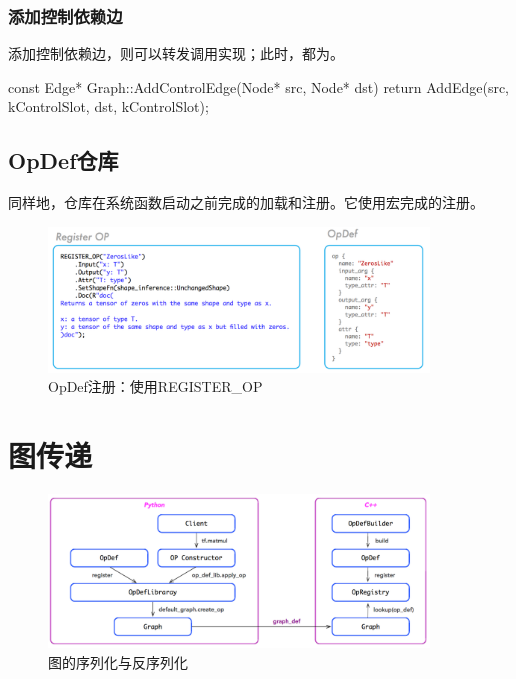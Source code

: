 \begin{content}
\subsubsection{添加控制依赖边}

添加控制依赖边，则可以转发调用实现；此时，都为。

\begin{leftbar}
\begin{c++}
const Edge* Graph::AddControlEdge(Node* src, Node* dst) {
  return AddEdge(src, kControlSlot, dst, kControlSlot);
}
\end{c++}
\end{leftbar}

\subsection{OpDef仓库}

同样地，仓库在系统函数启动之前完成的加载和注册。它使用宏完成的注册。

\begin{figure}[!htbp]
\centering
\includegraphics[width=0.9\textwidth]{figures/cc-op-repo.png}
\caption{OpDef注册：使用REGISTER\_OP}
 \label{fig:cc-op-repo}
\end{figure}

\end{content}

\section{图传递}

\begin{content}

\begin{figure}[!htbp]
\centering
\includegraphics[width=0.9\textwidth]{figures/py-graph-creation.png}
\caption{图的序列化与反序列化}
 \label{fig:py-graph-creation}
\end{figure}

\end{content}

